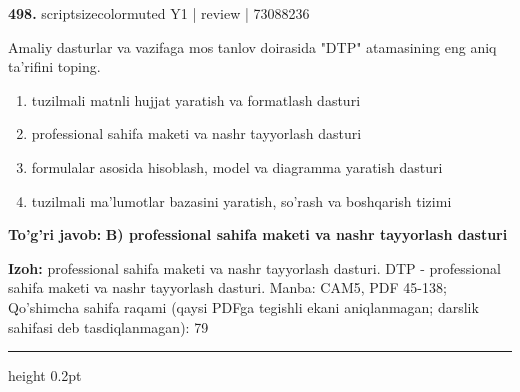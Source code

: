 \documentclass[10pt,a4paper]{article}
\begin{document}
{\bfseries\sffamily\color{ink} 498.} {scriptsizecolor{muted} Y1 | review | 73088236}
\par
Amaliy dasturlar va vazifaga mos tanlov doirasida "DTP" atamasining eng aniq ta'rifini toping.
\begin{enumerate}[label=\Alph*),leftmargin=9mm]
\item tuzilmali matnli hujjat yaratish va formatlash dasturi
\item professional sahifa maketi va nashr tayyorlash dasturi
\item formulalar asosida hisoblash, model va diagramma yaratish dasturi
\item tuzilmali ma'lumotlar bazasini yaratish, so'rash va boshqarish tizimi
\end{enumerate}
\begin{tcolorbox}[enhanced,breakable,colback=teal!4,colframe=teal!60!black,boxrule=0.45pt,arc=1.2mm,left=2.7mm,right=2.7mm,top=1.8mm,bottom=1.8mm,before skip=2mm,after skip=2mm]
{\bfseries\sffamily\color{teal}To'g'ri javob:} \textbf{B) professional sahifa maketi va nashr tayyorlash dasturi}
\par\smallskip
{\bfseries Izoh:} professional sahifa maketi va nashr tayyorlash dasturi. DTP - professional sahifa maketi va nashr tayyorlash dasturi. Manba: CAM5, PDF 45-138; Qo'shimcha sahifa raqami (qaysi PDFga tegishli ekani aniqlanmagan; darslik sahifasi deb tasdiqlanmagan): 79
\end{tcolorbox}
\vspace{2mm}\hrule height 0.2pt\vspace{3mm}
\end{document}
